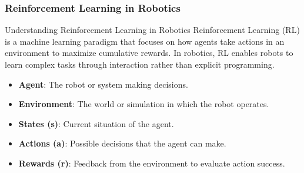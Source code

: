 \documentclass[aspectratio=169]{beamer}
\begin{document}
\begin{frame}[fragile]
    \frametitle{Reinforcement Learning in Robotics}
    \begin{block}{Understanding Reinforcement Learning in Robotics}
        Reinforcement Learning (RL) is a machine learning paradigm that focuses on how agents take actions in an environment to maximize cumulative rewards. In robotics, RL enables robots to learn complex tasks through interaction rather than explicit programming.
    \end{block}
    
    \begin{itemize}
        \item \textbf{Agent}: The robot or system making decisions.
        \item \textbf{Environment}: The world or simulation in which the robot operates.
        \item \textbf{States (s)}: Current situation of the agent.
        \item \textbf{Actions (a)}: Possible decisions that the agent can make.
        \item \textbf{Rewards (r)}: Feedback from the environment to evaluate action success.
    \end{itemize}
\end{frame}
\end{document}
